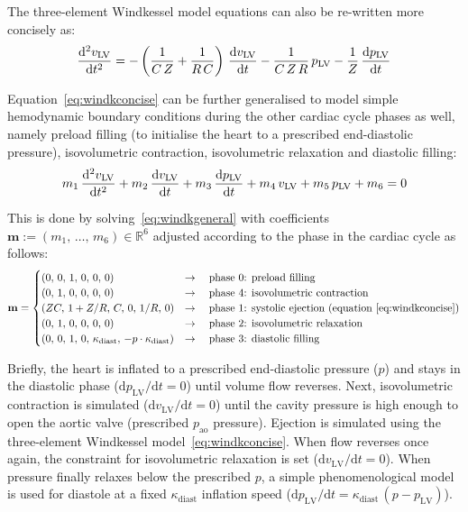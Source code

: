 \vspace{0.5cm}
\noindent
The three-element Windkessel model equations can also be re-written more concisely as:
%
\begin{equation}\label{eq:windkconcise}
    \dfrac{\mathrm{d}^2{v_{\textrm{LV}}}}{\mathrm{d}{t}^2} = -\left(\frac{1}{C\,Z}+\frac{1}{R\,C}\right)\,\dfrac{\mathrm{d}{v_{\textrm{LV}}}}{\mathrm{d}{t}}-\frac{1}{C\,Z\,R}\,p_{\textrm{LV}}-\frac{1}{Z}\,\dfrac{\mathrm{d}{p_{\textrm{LV}}}}{\mathrm{d}{t}}
\end{equation}

\vspace{0.2cm}
Equation~\eqref{eq:windkconcise} can be further generalised to model simple hemodynamic boundary conditions during the other cardiac cycle phases as well, namely preload filling (to initialise the heart to a prescribed end-diastolic pressure), isovolumetric contraction, isovolumetric relaxation and diastolic filling:
%
\begin{equation}\label{eq:windkgeneral}
    m_1\,\dfrac{\mathrm{d}^2{v_{\textrm{LV}}}}{\mathrm{d}{t}^2} + m_2\,\dfrac{\mathrm{d}{v_{\textrm{LV}}}}{\mathrm{d}{t}} + m_3\,\dfrac{\mathrm{d}{p_{\textrm{LV}}}}{\mathrm{d}{t}} + m_4\,v_{\textrm{LV}} + m_5\,p_{\textrm{LV}} +  m_6 = 0
\end{equation}

\noindent
This is done by solving~\eqref{eq:windkgeneral} with coefficients  $\mathbf{m}:=(m_1,\,\dots,\,m_6)\in\mathbb{R}^6$ adjusted according to the phase in the cardiac cycle as follows:
%
\begin{equation}
    \mathbf{m} = \begin{cases}
    (0,\,0,\,1,\,0,\,0,\,0) & \rightarrow\quad\text{phase $0$: preload filling} \\
    (0,\,1,\,0,\,0,\,0,\,0) & \rightarrow\quad\text{phase $4$: isovolumetric contraction} \\
    (ZC,\,1+Z/R,\,C,\,0,\,1/R,\,0) & \rightarrow\quad\text{phase $1$: systolic ejection (equation~\eqref{eq:windkconcise})} \\
    (0,\,1,\,0,\,0,\,0,\,0) & \rightarrow\quad\text{phase $2$: isovolumetric relaxation} \\
    (0,\,0,\,1,\,0,\,\kappa_{\textrm{diast}},\,-p\cdot \kappa_{\textrm{diast}}) & \rightarrow\quad\text{phase $3$: diastolic filling}
    \end{cases}
\end{equation}

\noindent
Briefly, the heart is inflated to a prescribed end-diastolic pressure ($p$) and stays in the diastolic phase ($\textrm{d}p_{\textrm{LV}}/\textrm{d}t=0$) until volume flow reverses. Next, isovolumetric contraction is simulated ($\textrm{d}v_{\textrm{LV}}/\textrm{d}t=0$) until the cavity pressure is high enough to open the aortic valve (prescribed $p_{\textrm{ao}}$ pressure). Ejection is simulated using the three-element Windkessel model~\eqref{eq:windkconcise}. When flow reverses once again, the constraint for isovolumetric relaxation is set ($\textrm{d}v_{\textrm{LV}}/\textrm{d}t=0$). When pressure finally relaxes below the prescribed $p$, a simple phenomenological model is used for diastole at a fixed $\kappa_{\textrm{diast}}$ inflation speed ($\textrm{d}p_{\textrm{LV}}/\textrm{d}t=\kappa_{\textrm{diast}}\,(p - p_{\textrm{LV}})$).



